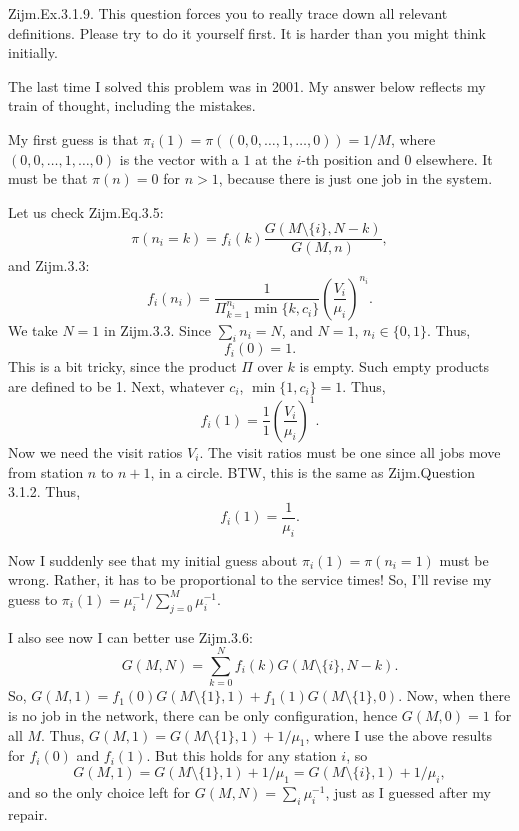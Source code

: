 \begin{question}
  Zijm.Ex.3.1.9. This question forces you to really trace down all
  relevant definitions. Please try to do it yourself first. It is
  harder than you might think initially.
\begin{solution}
  The last time I solved this problem was in 2001. My answer below
  reflects my train of thought, including the mistakes. 

  My first guess is that
  $\pi_i(1) = \pi((0,0,\ldots, 1,\ldots, 0))= 1/M$, where
  $(0,0,\ldots, 1,\ldots, 0)$ is the vector with a $1$ at the $i$-th
  position and $0$ elsewhere. It must be that $\pi(n)=0$ for $n>1$,
  because there is just one job in the system.

Let us check Zijm.Eq.3.5:
\begin{equation*}
  \pi(n_i=k) = f_i(k) \frac{G(M\setminus\{i\}, N-k)}{G(M,n)},
\end{equation*}
and  Zijm.3.3:
\begin{equation*}
  f_i(n_i) = \frac{1}{\Pi_{k=1}^{n_i} \min\{k, c_i\}} \left(\frac{V_i}{\mu_i}\right)^{n_i}.
\end{equation*}
We take $N=1$ in Zijm.3.3. Since $\sum_{i} n_i = N$, and $N=1$,
$n_i\in\{0,1\}$. Thus,
\begin{equation*}
  f_i(0) = 1.
\end{equation*}
This is a bit tricky, since the product $\Pi$ over $k$ is empty. Such empty products are defined to be 1. Next, whatever $c_i$, $\min\{1,c_i\}=1$. Thus, 
\begin{equation*}
  f_i(1) = \frac 11 \left(\frac{V_i}{\mu_i}\right)^{1}.
\end{equation*}
Now we need the visit ratios $V_i$. The visit ratios must be one since
all jobs move from station $n$ to $n+1$, in a circle. BTW, this is the
same as Zijm.Question 3.1.2.  Thus, 
\begin{equation*}
  f_i(1) = \frac{1}{\mu_i}.
\end{equation*}

Now I suddenly see that my initial guess about $\pi_i(1) = \pi(n_i=1)$
must be wrong. Rather, it has to be proportional to the service times!
So, I'll revise my guess to
$\pi_i(1) = \mu_i^{-1}/\sum_{j=0}^M \mu_i^{-1}$. 

I also see now  I can better use Zijm.3.6:
\begin{equation*}
  G(M,N)=\sum_{k=0}^N f_i(k)G(M\setminus\{i\} , N-k).
\end{equation*}
So,
$G(M,1) = f_1(0)G(M\setminus\{1\}, 1) + f_1(1)G(M\setminus\{1\},
0)$.
Now, when there is no job in the network, there can be only
configuration, hence $G(M,0)=1$ for all $M$. Thus,
$G(M,1) = G(M\setminus\{1\}, 1) + 1/\mu_1$, where I use the above
results for $f_i(0)$ and $f_i(1)$. But this holds for any station $i$,
so
\begin{equation*}
  G(M,1) = G(M\setminus\{1\}, 1) + 1/\mu_1 = G(M\setminus\{i\}, 1) + 1/\mu_i,
\end{equation*}
and so the only choice left for $G(M,N) = \sum_i \mu_i^{-1}$, just as
I guessed after my repair.


\end{solution}
\end{question}
